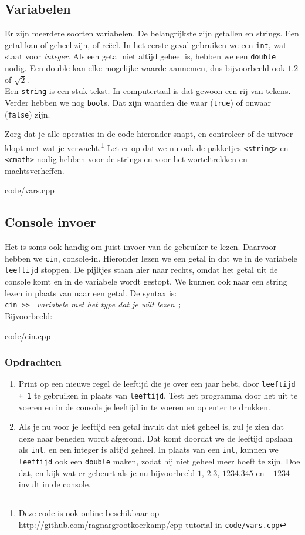 \documentclass[12pt,a4paper]{article}
\newcommand{\code}{}
\newcommand{\icode}{\lstinline}
\newcommand{\mono}{\texttt}
\begin{document}
\subsection{Variabelen}
Er zijn meerdere soorten variabelen. De belangrijkste zijn getallen en strings. Een getal kan of geheel zijn, of re\"eel. In het eerste geval gebruiken we een \icode{int}, wat staat voor \emph{integer}. Als een getal niet altijd geheel is, hebben we een \icode{double} nodig. Een double kan elke mogelijke waarde aannemen, dus bijvoorbeeld ook $1.2$ of $\sqrt 2$.\\
Een \icode{string} is een stuk tekst. In computertaal is dat gewoon een rij van tekens. Verder hebben we nog \icode{bool}s. Dat zijn waarden die waar (\icode{true}) of onwaar (\icode{false}) zijn.

Zorg dat je alle operaties in de code hieronder snapt, en controleer of de uitvoer klopt met wat je verwacht.\footnote{Deze code is ook online beschikbaar op \url{http://github.com/ragnargrootkoerkamp/cpp-tutorial} in \mono{code/vars.cpp}}
Let er op dat we nu ook de pakketjes \icode{<string>} en \icode{<cmath>} nodig hebben voor de strings en voor het worteltrekken en machtsverheffen.

\code{code/vars.cpp}


\subsection{Console invoer}
Het is soms ook handig om juist invoer van de gebruiker te lezen. Daarvoor hebben we \icode{cin}, console-in. Hieronder lezen we een getal in dat we in de variabele \icode{leeftijd} stoppen. De pijltjes staan hier naar rechts, omdat het getal uit de console komt en in de variabele wordt gestopt. We kunnen ook naar een string lezen in plaats van naar een getal. De syntax is: \\

\icode{cin >> } \emph{variabele met het type dat je wilt lezen} \icode{;}\\

Bijvoorbeeld:

\code{code/cin.cpp}
\subsubsection{Opdrachten}
\begin{enumerate}
	\item Print op een nieuwe regel de leeftijd die je over een jaar hebt, door \icode{leeftijd + 1} te gebruiken in plaats van \icode{leeftijd}.
		Test het programma door het uit te voeren en in de console je leeftijd in te voeren en op enter te drukken.
	\item
		Als je nu voor je leeftijd een getal invult dat niet geheel is, zul je zien dat deze naar beneden wordt afgerond. Dat komt doordat we de leeftijd opslaan als \icode{int}, en een integer is altijd geheel.
		In plaats van een \icode{int}, kunnen we \icode{leeftijd} ook een \icode{double} maken, zodat hij niet geheel meer hoeft te zijn. Doe dat, en kijk wat er gebeurt als je nu bijvoorbeeld $1$, $2.3$, $1234.345$ en $-1234$ invult in de console.
\end{enumerate}
\end{document}
